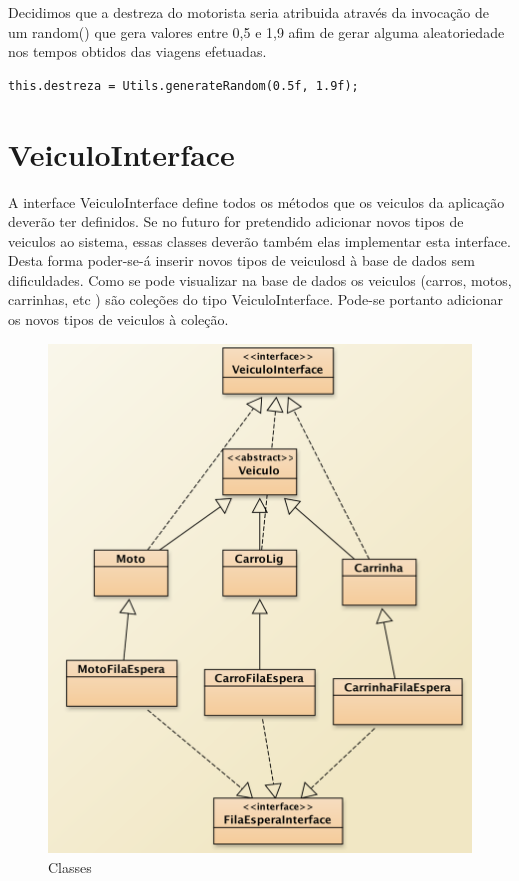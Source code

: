 Decidimos que a destreza do motorista seria atribuida através da invocação de um random() que gera valores entre 0,5  e 1,9 afim de gerar alguma aleatoriedade nos tempos obtidos das viagens efetuadas. 
\begin{verbatim}
this.destreza = Utils.generateRandom(0.5f, 1.9f); 
\end{verbatim}

\newpage
\section{VeiculoInterface}

A interface VeiculoInterface define todos os métodos que os veiculos da aplicação deverão ter definidos. 
Se no futuro for pretendido adicionar novos tipos de veiculos ao sistema, essas classes deverão também elas implementar esta interface.  Desta forma poder-se-á inserir novos tipos de veiculosd à base de dados sem dificuldades. Como se pode visualizar na base de dados os veiculos (carros, motos, carrinhas, etc ) são coleções do tipo VeiculoInterface. Pode-se portanto adicionar os novos tipos de veiculos à coleção. 


\begin{figure}[htpb]
	\centering
	\includegraphics[scale=0.6]{imagem/veiculo}
	\caption{Classes }
	\label{p2:fig:p2_veiculos}
\end{figure}

